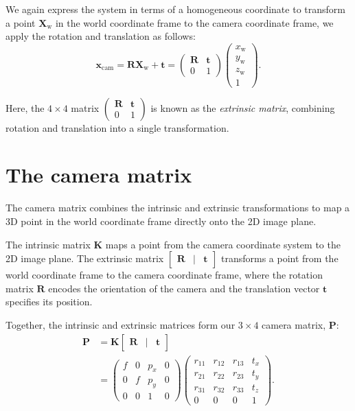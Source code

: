 \documentclass[12pt]{article}
\begin{document}
We again express the system in terms of a homogeneous coordinate to transform a point $\mathbf{X}_{\text{w}}$ in the world coordinate frame to the camera coordinate frame, we apply the rotation and translation as follows:
$$
\mathbf{x}_\text{cam} = 
\mathbf{R} \mathbf{X}_{\text{w}} + \mathbf{t} =
\begin{pmatrix} 
\mathbf{R} & \mathbf{t} \\
0 & 1
\end{pmatrix}
\begin{pmatrix} x_{\text{w}} \\ y_{\text{w}} \\ z_{\text{w}} \\ 1 \end{pmatrix}.
$$

Here, the $4\times 4$ matrix $
\begin{pmatrix} 
\mathbf{R} & \mathbf{t} \\
0 & 1
\end{pmatrix}
$
is known as the \textit{extrinsic matrix}, combining rotation and translation into a single transformation.

\section{The camera matrix}

The camera matrix combines the intrinsic and extrinsic transformations to map a 3D point in the world coordinate frame directly onto the 2D image plane.

The intrinsic matrix $\mathbf{K}$ maps a point from the camera coordinate system to the 2D image plane. The extrinsic matrix $\begin{bmatrix} \mathbf{R} & | & \mathbf{t} \end{bmatrix}$ transforms a point from the world coordinate frame to the camera coordinate frame, where the rotation matrix $\mathbf{R}$ encodes the orientation of the camera and the translation vector $\mathbf{t}$ specifies its position.

Together, the intrinsic and extrinsic matrices form our $3\times 4$ camera matrix, $\mathbf{P}$:
\begin{align*}
    \mathbf{P} &= \mathbf{K} \begin{bmatrix} \mathbf{R} & | & \mathbf{t} \end{bmatrix} \\
    &= \begin{pmatrix}
        f & 0 & p_x & 0 \\
        0 & f & p_y & 0 \\
        0 & 0 & 1 & 0
    \end{pmatrix}
    \begin{pmatrix}
        r_{11} & r_{12} & r_{13} & t_x \\
        r_{21} & r_{22} & r_{23} & t_y \\
        r_{31} & r_{32} & r_{33} & t_z \\
        0 & 0 & 0 & 1
    \end{pmatrix}.
\end{align*}
\end{document}
